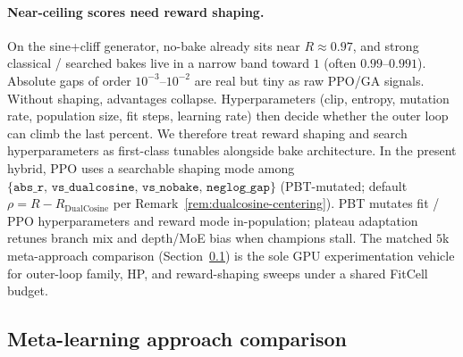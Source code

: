 \paragraph{Near-ceiling scores need reward shaping.}
\label{sec:reward-shaping}
On the sine{+}cliff generator, no-bake already sits near $R\approx 0.97$, and strong classical / searched bakes live in a narrow band toward $1$ (often $0.99$--$0.991$).
Absolute gaps of order $10^{-3}$--$10^{-2}$ are real but tiny as raw PPO/GA signals.
Without shaping, advantages collapse.
Hyperparameters (clip, entropy, mutation rate, population size, fit steps, learning rate) then decide whether the outer loop can climb the last percent.
We therefore treat reward shaping and search hyperparameters as first-class tunables alongside bake architecture.
In the present hybrid, PPO uses a searchable shaping mode among $\{\texttt{abs\_r},\,\texttt{vs\_dualcosine},\,\texttt{vs\_nobake},\,\texttt{neglog\_gap}\}$ (PBT-mutated; default $\rho = R - R_{\mathrm{DualCosine}}$ per Remark~\ref{rem:dualcosine-centering}).
PBT mutates fit / PPO hyperparameters and reward mode in-population; plateau adaptation retunes branch mix and depth/MoE bias when champions stall.
The matched $5$k meta-approach comparison (Section~\ref{sec:meta-compare}) is the sole GPU experimentation vehicle for outer-loop family, HP, and reward-shaping sweeps under a shared FitCell budget.

\subsection{Meta-learning approach comparison}
\label{sec:meta-compare}

